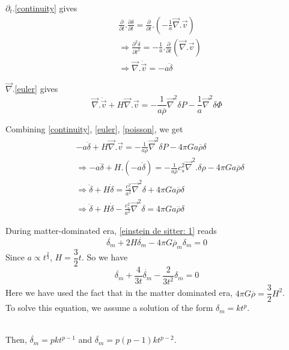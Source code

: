 \documentclass[a4,12pt,oneside]{report}
\begin{document}
	$ \partial_t $.\eqref{continuity} gives
	\begin{align}\label{key}
	&\frac{\partial}{\partial t}.\frac{\partial \delta}{\partial t} = \frac{\partial}{\partial t}.\left(-\frac{1}{a}\overrightarrow{\nabla}.\vec{v}\right)	
	\\
	&\Rightarrow \frac{\partial^2\delta}{\partial t^2} = -\frac{1}{a}.\frac{\partial}{\partial t}(\overrightarrow{\nabla}.\vec{v})
	\\
	&\Rightarrow\overrightarrow{\nabla}.\dot{\vec{v}} = -a\ddot{\delta}  
	\end{align}
	
	$ \overrightarrow{\nabla} $.\eqref{euler} gives 
	\begin{equation}\label{key}
	\overrightarrow{\nabla}.\dot{\vec{v}} + H\overrightarrow{\nabla}.\vec{v} = -\frac{1}{a\overline{\rho}}\overrightarrow{\nabla}^2\delta P - \frac{1}{a}\overrightarrow{\nabla}^2\delta\Phi
	\end{equation}
	
	Combining \eqref{continuity}, \eqref{euler}, \eqref{poisson}, we get
	\begin{align}
	&-a\ddot{\delta} + H\overrightarrow{\nabla}.\vec{v} = -\frac{1}{a\overline{\rho}}\overrightarrow{\nabla}^2 \delta P - 4\pi Ga\overline{\rho}\delta \nonumber
	\\
	&\Rightarrow-a\ddot{\delta} + H.(-a\dot{\delta}) = -\frac{1}{a\overline{\rho}}c_s^2\overrightarrow{\nabla}^2.\delta \rho - 4 \pi Ga\overline{\rho}\delta \nonumber
	\\
	&\Rightarrow \ddot{\delta} + H\dot{\delta} = \frac{c_s^2}{a^2}\overrightarrow{\nabla}^2\delta + 4\pi Ga\overline{\rho}\delta \nonumber
	\\
	&\boxed{\Rightarrow \ddot{\delta}+H\dot{\delta}-\frac{c_s^2}{a^2}\overrightarrow{\nabla}^2\delta = 4\pi Ga\overline{\rho}\delta} \label{einstein de sitter: 1}
	\end{align}
	
	During matter-dominated era, \eqref{einstein de sitter: 1} reads
	\begin{equation}\label{key}
	\ddot{\delta_m} + 2H\dot{\delta_m} - 4\pi G\overline{\rho}_m\delta_m = 0
	\end{equation}
	Since $ a\propto t^{\frac{2}{3}} $, $ H=\dfrac{3}{2}t $. So we have
	\begin{equation}\label{key}
	\ddot{\delta_m} + \frac{4}{3t}\dot{\delta_m} - \frac{2}{3t^2}\delta_m = 0
	\end{equation}
	Here we have used the fact that in the matter dominated era, $ 4\pi G \overline{\rho} = \dfrac{3}{2}H^2 $.
	\\
	To solve this equation, we assume a solution of the form $ \delta_m = kt^p $. \\ \\
	\begin{center}
		Then, $ \dot{\delta_m} = pkt^{p-1} $ and $ \ddot{\delta_m} = p(p-1)kt^{p-2}$.
	\end{center}
	
\end{document}
